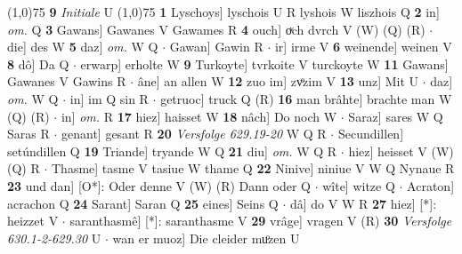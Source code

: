 \documentclass[8pt,a4paper,notitlepage]{article}
\begin{document}
\begin{table}[ht]
\begin{minipage}[t]{0.5\linewidth}
\line(1,0){75} \newline
\textbf{9} \textit{Initiale} U  \newline
\line(1,0){75} \newline
\textbf{1} Lyschoys] lyschois U R lyshois W liszhois Q \textbf{2} in] \textit{om.} Q \textbf{3} Gawans] Gawanes V Gawames R \textbf{4} ouch] oͮch dvrch V (W) (Q) (R)  $\cdot$ die] des W \textbf{5} daz] \textit{om.} W Q  $\cdot$ Gawan] Gawin R  $\cdot$ ir] irme V \textbf{6} weinende] weinen V \textbf{8} dô] Da Q  $\cdot$ erwarp] erholte W \textbf{9} Turkoyte] tvrkoite V turckoyte W \textbf{11} Gawans] Gawanes V Gawins R  $\cdot$ âne] an allen W \textbf{12} zuo im] zvͦzim V \textbf{13} unz] Mit U  $\cdot$ daz] \textit{om.} W Q  $\cdot$ in] im Q sin R  $\cdot$ getruoc] truck Q (R) \textbf{16} man brâhte] brachte man W (Q) (R)  $\cdot$ in] \textit{om.} R \textbf{17} hiez] haisset W \textbf{18} nâch] Do noch W  $\cdot$ Saraz] sares W Q Saras R  $\cdot$ genant] gesant R \textbf{20} \textit{Versfolge 629.19-20} W Q R   $\cdot$ Secundillen] setúndillen Q \textbf{19} Triande] tryande W Q \textbf{21} diu] \textit{om.} W Q R  $\cdot$ hiez] heisset V (W) (Q) R  $\cdot$ Thasme] tasme V tasiue W thame Q \textbf{22} Ninive] niniue V W Q Nynaue R \textbf{23} und dan] [O*]: Oder denne V (W) (R) Dann oder Q  $\cdot$ wîte] witze Q  $\cdot$ Acraton] acrachon Q \textbf{24} Sarant] Saran Q \textbf{25} eines] Seins Q  $\cdot$ dâ] do V W R \textbf{27} hiez] [*]: heizzet V  $\cdot$ saranthasmê] [*]: saranthasme V \textbf{29} vrâge] vragen V (R) \textbf{30} \textit{Versfolge 630.1-2-629.30} U   $\cdot$ wan er muoz] Die cleider muͦzen U \newline
\end{minipage}
\end{table}
\end{document}
